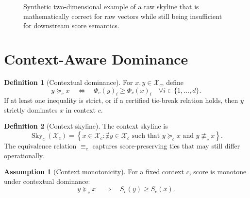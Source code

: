\documentclass[11pt,oneside]{article}
\theoremstyle{definition}
\newtheorem{definition}{Definition}[section]
\newtheorem{assumption}{Assumption}[section]
\newcommand{\Sky}{\operatorname{Sky}}
\newcommand{\cand}{\mathcal{X}}
\newcommand{\stats}{\Phi}
\newcommand{\score}{S}
\begin{document}
\begin{figure}[H]
\centering
{}
\caption{Synthetic two-dimensional example of a raw skyline that is mathematically correct for raw vectors while still being insufficient for downstream score semantics.}
\end{figure}

\section{Context-Aware Dominance}

\begin{definition}[Contextual dominance]
For \(x,y\in\cand_c\), define
\[
  y\succeq_c x
  \quad\Longleftrightarrow\quad
  \stats_c(y)_i\ge \stats_c(x)_i
  \quad \forall i\in\{1,\ldots,d\}.
\]
If at least one inequality is strict, or if a certified tie-break relation holds, then \(y\) strictly dominates \(x\) in context \(c\).
\end{definition}

\begin{definition}[Context skyline]
The context skyline is
\[
  \Sky_c(\cand_c)
  =
  \left\{
    x\in\cand_c:
    \nexists y\in\cand_c
    \text{ such that } y\succeq_c x
    \text{ and } y\not\equiv_c x
  \right\}.
\]
The equivalence relation \(\equiv_c\) captures score-preserving ties that may still differ operationally.
\end{definition}

\begin{assumption}[Context monotonicity]
For a fixed context \(c\), score is monotone under contextual dominance:
\[
  y\succeq_c x
  \quad\Longrightarrow\quad
  \score_c(y)\ge\score_c(x).
\]
\end{assumption}
\end{document}
